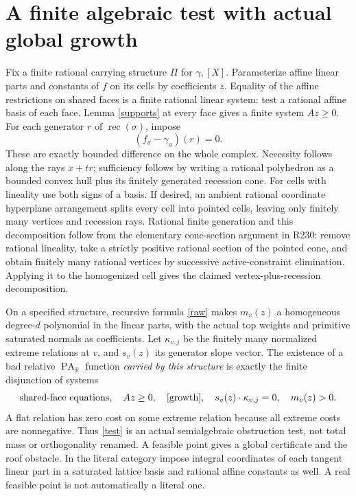 \documentclass[11pt]{article}
\newcommand{\R}{\mathbb R}
\newcommand{\PA}{\operatorname{PA}}
\newcommand{\rec}{\operatorname{rec}}
\begin{document}
\section{A finite algebraic test with actual global growth}
Fix a finite rational carrying structure \(\Pi\) for \(\gamma,[X]\).
Parameterize affine linear parts and constants of \(f\) on its cells by
coefficients \(z\). Equality of the affine restrictions on shared faces
is a finite rational linear system: test a rational affine basis of each
face. Lemma \ref{supports} at every face gives a finite system
\(Az\geq0\).
For each generator \(r\) of \(\rec(\sigma)\), impose
\begin{equation}\label{growth}
 (f_\sigma-\gamma_\sigma)(r)=0.
\end{equation}
These are exactly bounded difference on the whole complex.
Necessity follows along the rays \(x+tr\); sufficiency follows by
writing a rational polyhedron as a bounded convex hull plus its
finitely generated recession cone. For cells with lineality use both
signs of a basis. If desired, an ambient rational coordinate
hyperplane arrangement splits every cell into pointed cells, leaving
only finitely many vertices and recession rays. Rational finite
generation and this decomposition follow from the elementary
cone-section argument in R230: remove rational lineality, take a
strictly positive rational section of the pointed cone, and obtain
finitely many rational vertices by successive active-constraint
elimination. Applying it to the homogenized cell gives the claimed
vertex-plus-recession decomposition.

On a specified structure, recursive formula \eqref{raw} makes
\(m_v(z)\) a homogeneous degree-\(d\) polynomial in the linear parts,
with the actual top weights and primitive saturated normals as
coefficients. Let \(\kappa_{v,j}\) be the finitely many normalized
extreme relations at \(v\), and \(s_v(z)\) its generator slope vector.
The existence of a bad relative \(\PA_\R\) function \emph{carried by
this structure} is exactly the finite disjunction of systems
\begin{equation}\label{test}
 \text{shared-face equations},\quad Az\geq0,\quad
 \eqref{growth},\quad
 s_v(z)\cdot\kappa_{v,j}=0,\quad m_v(z)>0.
\end{equation}
A flat relation has zero cost on some extreme relation because all
extreme costs are nonnegative. Thus \eqref{test} is an actual
semialgebraic obstruction test, not total mass or orthogonality
renamed. A feasible point gives a global certificate and the roof
obstacle. In the literal category impose integral coordinates of
each tangent linear part in a saturated lattice basis and rational
affine constants as well. A real feasible point is not automatically
a literal one.
\end{document}
